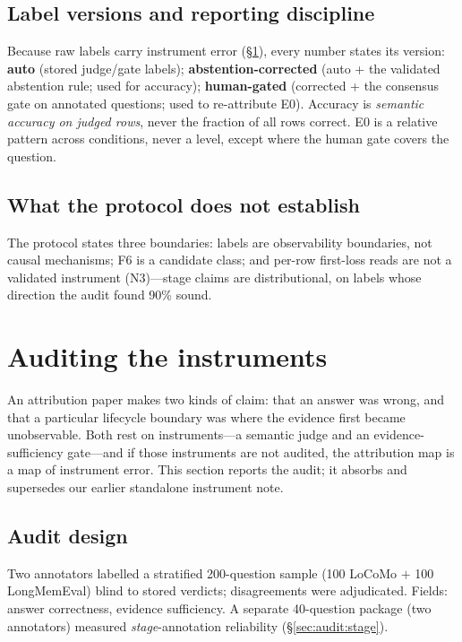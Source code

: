 \documentclass[11pt]{article}
\begin{document}
\subsection{Label versions and reporting discipline}

Because raw labels carry instrument error (\S\ref{sec:audit}), every number
states its version: \textbf{auto} (stored judge/gate labels);
\textbf{abstention-corrected} (auto + the validated abstention rule; used for
accuracy); \textbf{human-gated} (corrected + the consensus gate on annotated
questions; used to re-attribute E0). Accuracy is \emph{semantic accuracy on
judged rows}, never the fraction of all rows correct. E0 is a relative pattern
across conditions, never a level, except where the human gate covers the
question.

\subsection{What the protocol does not establish}

The protocol states three boundaries: labels are observability boundaries,
not causal mechanisms; F6 is a candidate class; and per-row first-loss reads
are not a validated instrument (N3)---stage claims are distributional, on
labels whose direction the audit found 90\% sound.

\section{Auditing the instruments}
\label{sec:audit}

An attribution paper makes two kinds of claim: that an answer was wrong, and
that a particular lifecycle boundary was where the evidence first became
unobservable. Both rest on instruments---a semantic judge and an
evidence-sufficiency gate---and if those instruments are not audited, the
attribution map is a map of instrument error. This section reports the audit;
it absorbs and supersedes our earlier standalone instrument note.

\subsection{Audit design}

Two annotators labelled a stratified 200-question sample (100 LoCoMo $+$ 100
LongMemEval) blind to stored verdicts; disagreements were adjudicated. Fields:
answer correctness, evidence sufficiency. A separate 40-question package
(two annotators) measured \emph{stage}-annotation reliability
(\S\ref{sec:audit:stage}).
\end{document}
